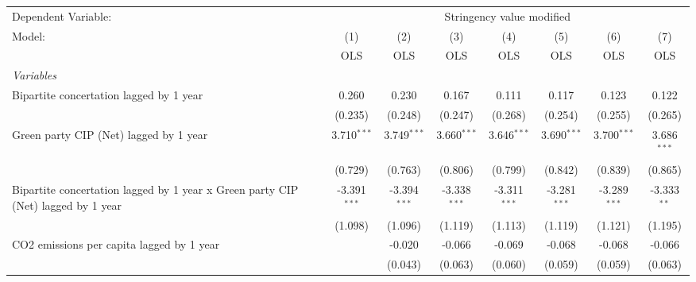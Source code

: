 
\begingroup
\centering
\begin{tabular}{lccccccc}
   \toprule
   Dependent Variable: & \multicolumn{7}{c}{Stringency value modified}\\
   Model:                                                                           & (1)            & (2)            & (3)            & (4)            & (5)            & (6)            & (7)\\  
                                                                                    &  OLS           & OLS            & OLS            & OLS            & OLS            & OLS            & OLS\\  
   \midrule
   \emph{Variables}\\
   Bipartite concertation lagged by 1 year                                          & 0.260          & 0.230          & 0.167          & 0.111          & 0.117          & 0.123          & 0.122\\   
                                                                                    & (0.235)        & (0.248)        & (0.247)        & (0.268)        & (0.254)        & (0.255)        & (0.265)\\   
   Green party CIP (Net) lagged by 1 year                                           & 3.710$^{***}$  & 3.749$^{***}$  & 3.660$^{***}$  & 3.646$^{***}$  & 3.690$^{***}$  & 3.700$^{***}$  & 3.686$^{***}$\\   
                                                                                    & (0.729)        & (0.763)        & (0.806)        & (0.799)        & (0.842)        & (0.839)        & (0.865)\\   
   Bipartite concertation lagged by 1 year x Green party CIP (Net) lagged by 1 year & -3.391$^{***}$ & -3.394$^{***}$ & -3.338$^{***}$ & -3.311$^{***}$ & -3.281$^{***}$ & -3.289$^{***}$ & -3.333$^{**}$\\   
                                                                                    & (1.098)        & (1.096)        & (1.119)        & (1.113)        & (1.119)        & (1.121)        & (1.195)\\   
   CO2 emissions per capita lagged by 1 year                                        &                & -0.020         & -0.066         & -0.069         & -0.068         & -0.068         & -0.066\\   
                                                                                    &                & (0.043)        & (0.063)        & (0.060)        & (0.059)        & (0.059)        & (0.063)\\   

\end{tabular}
